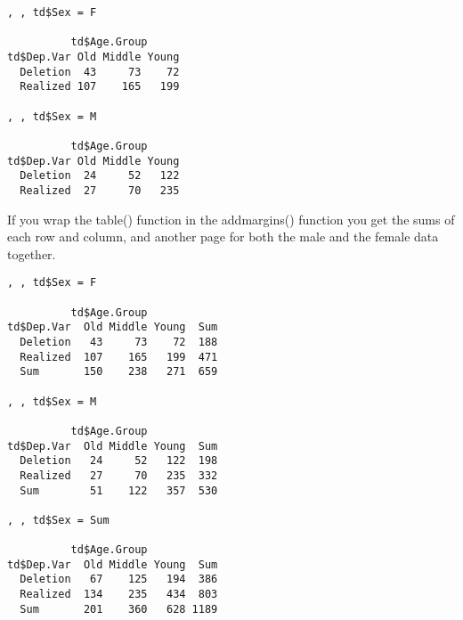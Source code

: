 \documentclass[
  12pt,
  letterpaper]{article}
\newenvironment{Shaded}{\begin{snugshade}}{\end{snugshade}}
\newcommand{\AttributeTok}[1]{\textcolor[rgb]{0.40,0.45,0.13}{#1}}
\newcommand{\CommentTok}[1]{\textcolor[rgb]{0.37,0.37,0.37}{#1}}
\newcommand{\DecValTok}[1]{\textcolor[rgb]{0.68,0.00,0.00}{#1}}
\newcommand{\FunctionTok}[1]{\textcolor[rgb]{0.28,0.35,0.67}{#1}}
\newcommand{\NormalTok}[1]{\textcolor[rgb]{0.00,0.23,0.31}{#1}}
\newcommand{\SpecialCharTok}[1]{\textcolor[rgb]{0.37,0.37,0.37}{#1}}
\renewcommand\texttt[1]{{\ttfamily\color{BrickRed}#1}}
\begin{document}
\begin{Shaded}
\end{Shaded}

\begin{verbatim}
, , td$Sex = F

          td$Age.Group
td$Dep.Var Old Middle Young
  Deletion  43     73    72
  Realized 107    165   199

, , td$Sex = M

          td$Age.Group
td$Dep.Var Old Middle Young
  Deletion  24     52   122
  Realized  27     70   235
\end{verbatim}

If you wrap the \texttt{table()} function in the \texttt{addmargins()}
function you get the sums of each row and column, and another page for
both the male and the female data together.

\begin{Shaded}
\end{Shaded}

\begin{verbatim}
, , td$Sex = F

          td$Age.Group
td$Dep.Var  Old Middle Young  Sum
  Deletion   43     73    72  188
  Realized  107    165   199  471
  Sum       150    238   271  659

, , td$Sex = M

          td$Age.Group
td$Dep.Var  Old Middle Young  Sum
  Deletion   24     52   122  198
  Realized   27     70   235  332
  Sum        51    122   357  530

, , td$Sex = Sum

          td$Age.Group
td$Dep.Var  Old Middle Young  Sum
  Deletion   67    125   194  386
  Realized  134    235   434  803
  Sum       201    360   628 1189
\end{verbatim}
\end{document}
